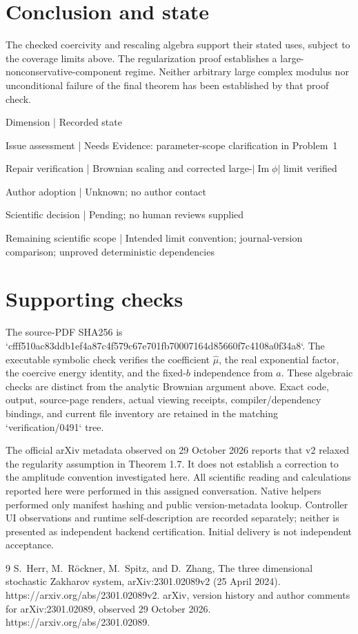 \documentclass[10pt]{article}
\begin{document}
\section*{Conclusion and state}
The checked coercivity and rescaling algebra support their stated uses, subject to the coverage limits above. The regularization proof establishes a large-nonconservative-component regime. Neither arbitrary large complex modulus nor unconditional failure of the final theorem has been established by that proof check.\par
Dimension | Recorded state\par
Issue assessment | Needs Evidence: parameter-scope clarification in Problem 1\par
Repair verification | Brownian scaling and corrected large-\(|\operatorname{Im}\phi|\) limit verified\par
Author adoption | Unknown; no author contact\par
Scientific decision | Pending; no human reviews supplied\par
Remaining scientific scope | Intended limit convention; journal-version comparison; unproved deterministic dependencies\par
\section*{Supporting checks}
The source-PDF SHA256 is `cfff510ac83ddb1ef4a87c4f579c67e701fb70007164d85660f7c4108a0f34a8`. The executable symbolic check verifies the coefficient \(\widehat\mu\), the real exponential factor, the coercive energy identity, and the fixed-\(b\) independence from \(a\). These algebraic checks are distinct from the analytic Brownian argument above. Exact code, output, source-page renders, actual viewing receipts, compiler/dependency bindings, and current file inventory are retained in the matching `verification/0491` tree.\par
The official arXiv metadata observed on 29 October 2026 reports that v2 relaxed the regularity assumption in Theorem 1.7. It does not establish a correction to the amplitude convention investigated here. All scientific reading and calculations reported here were performed in this assigned conversation. Native helpers performed only manifest hashing and public version-metadata lookup. Controller UI observations and runtime self-description are recorded separately; neither is presented as independent backend certification. Initial delivery is not independent acceptance.\par
9 S. Herr, M. Röckner, M. Spitz, and D. Zhang, The three dimensional stochastic Zakharov system, arXiv:2301.02089v2 (25 April 2024). https://arxiv.org/abs/2301.02089v2. arXiv, version history and author comments for arXiv:2301.02089, observed 29 October 2026. https://arxiv.org/abs/2301.02089.\par
\end{document}
